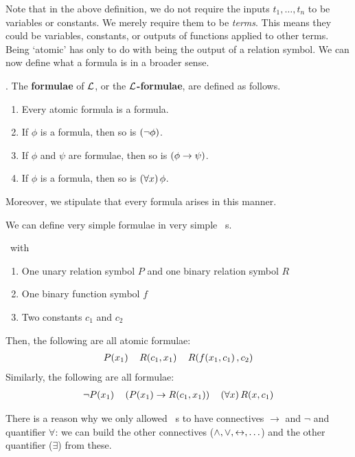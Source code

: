 Note that in the above definition, we do not require the inputs $t_1, \ldots, t_n$ to be variables or constants. We merely require them to be \textit{terms}. This means they could be variables, constants, or outputs of functions applied to other terms. Being `atomic' has only to do with being the output of a relation symbol. We can now define what a formula is in a broader sense.

\begin{boxdefinition}[Formula]
    . The \textbf{formulae} of $\mathcal{L}$, or the \textbf{$\mathcal{L}$-formulae}, are defined as follows.
    \begin{enumerate}
        \item Every atomic formula is a formula.
        \item If $\phi$ is a formula, then so is $\left( \neg \phi \right)$.
        \item If $\phi$ and $\psi$ are formulae, then so is $\left( \phi \to \psi \right)$.
        \item If $\phi$ is a formula, then so is $\left( \forall x \right) \phi$.
    \end{enumerate}
    Moreover, we stipulate that every formula arises in this manner.
\end{boxdefinition}

We can define very simple formulae in very simple \fola~s.

\begin{boxexample}
    \ with
    \begin{enumerate}
        \item One unary relation symbol $P$ and one binary relation symbol $R$
        \item One binary function symbol $f$
        \item Two constants $c_1$ and $c_2$
    \end{enumerate}
    Then, the following are all atomic formulae:
    \begin{align*}
        P\!\left( x_1 \right) \quad R\!\left( c_1, x_1 \right) \quad R\!\left( f\!\left( x_1, c_1 \right), c_2 \right)
    \end{align*}
    Similarly, the following are all formulae:
    \begin{align*}
        \neg P\!\left( x_1 \right) \quad \left( P\!\left( x_1 \right) \to R\!\left( c_1, x_1 \right) \right) \quad \left( \forall x \right) R\!\left( x, c_1 \right)
    \end{align*}
\end{boxexample}

There is a reason why we only allowed \fola~s to have connectives $\to$ and $\neg$ and quantifier $\forall$: we can build the other connectives ($\land, \lor, \leftrightarrow, \ldots$) and the other quantifier ($\exists$) from these.

